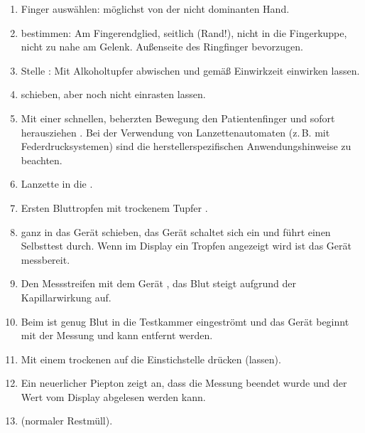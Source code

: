 {
\begin{enumerate}
  \item Finger auswählen: möglichst von der nicht dominanten
  Hand.
  \item {} bestimmen: Am Fingerendglied,
  seitlich (Rand!), nicht in die Fingerkuppe, nicht zu nahe
  am Gelenk. Außenseite des Ringfinger bevorzugen.
  \item Stelle : Mit Alkoholtupfer abwischen
  und gemäß Einwirkzeit einwirken lassen.
  \item {} schieben,
  aber noch nicht einrasten lassen.
  \item Mit einer schnellen, beherzten Bewegung den
  Patientenfinger  und sofort
  herausziehen . 
  Bei der Verwendung von Lanzettenautomaten (z.\,B. mit Federdrucksystemen) 
  sind die herstellerspezifischen Anwendungshinweise zu beachten.
  \item Lanzette in die  .
  \item Ersten Bluttropfen mit trockenem Tupfer .
  \item {} ganz in das Gerät schieben, das Gerät
  schaltet sich ein und führt einen Selbsttest durch. Wenn
  im Display ein Tropfen angezeigt wird ist das Gerät
  messbereit.
  \item Den Messstreifen mit dem Gerät , 
  das Blut steigt aufgrund der Kapillarwirkung auf. 
  \hfill{}
  \item Beim  ist genug Blut in die Testkammer
  eingeströmt und das Gerät beginnt mit der Messung und kann
  entfernt werden. 
  \item Mit einem trockenen  auf die Einstichstelle
  drücken (lassen).
  \item Ein neuerlicher Piepton zeigt an, dass die Messung
  beendet wurde und der Wert vom Display abgelesen
  werden kann. 
  \item {} (normaler Restmüll).
\end{enumerate}
}{

}{}{}{}

